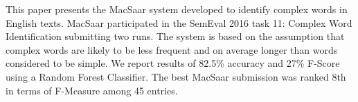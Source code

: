 This paper presents the MacSaar system developed to identify complex words in English texts. MacSaar participated in the SemEval 2016 task 11: Complex Word Identification submitting two runs. The system is based on the assumption that complex words are likely to be less frequent and on average longer than words considered to be simple. We report results of 82.5\% accuracy and 27\% F-Score using a Random Forest Classifier. The best MacSaar submission was ranked 8th in terms of F-Measure among 45 entries.
